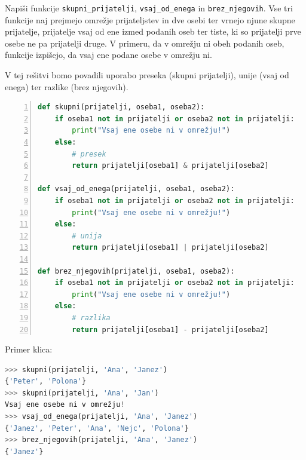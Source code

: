 \begin{zgled}
Napiši funkcije \texttt{skupni\_prijatelji}, \texttt{vsaj\_od\_enega} in \texttt{brez\_njegovih}. Vse tri funkcije naj prejmejo omrežje prijateljstev in dve osebi ter vrnejo njune skupne prijatelje, prijatelje vsaj od ene izmed podanih oseb ter tiste, ki so prijatelji prve osebe ne pa prijatelji druge. V primeru, da v omrežju ni obeh podanih oseb, funkcije izpišejo, da vsaj ene podane osebe v omrežju ni.
\end{zgled}
\begin{resitev}
V tej rešitvi bomo povadili uporabo preseka (skupni prijatelji), unije (vsaj od enega) ter razlike (brez njegovih). 
\begin{lstlisting}[language=Python, showstringspaces=false,numbers=left]
def skupni(prijatelji, oseba1, oseba2):
    if oseba1 not in prijatelji or oseba2 not in prijatelji:
        print("Vsaj ene osebe ni v omrežju!")
    else:
        # presek
        return prijatelji[oseba1] & prijatelji[oseba2]

def vsaj_od_enega(prijatelji, oseba1, oseba2):
    if oseba1 not in prijatelji or oseba2 not in prijatelji:
        print("Vsaj ene osebe ni v omrežju!")
    else:
        # unija
        return prijatelji[oseba1] | prijatelji[oseba2]

def brez_njegovih(prijatelji, oseba1, oseba2):
    if oseba1 not in prijatelji or oseba2 not in prijatelji:
        print("Vsaj ene osebe ni v omrežju!")
    else:
        # razlika
        return prijatelji[oseba1] - prijatelji[oseba2]
\end{lstlisting}
Primer klica:
\begin{lstlisting}[language=Python, showstringspaces=false]
>>> skupni(prijatelji, 'Ana', 'Janez')
{'Peter', 'Polona'}
>>> skupni(prijatelji, 'Ana', 'Jan')
Vsaj ene osebe ni v omrežju!
>>> vsaj_od_enega(prijatelji, 'Ana', 'Janez')
{'Janez', 'Peter', 'Ana', 'Nejc', 'Polona'}
>>> brez_njegovih(prijatelji, 'Ana', 'Janez')
{'Janez'}
\end{lstlisting}
\end{resitev}



